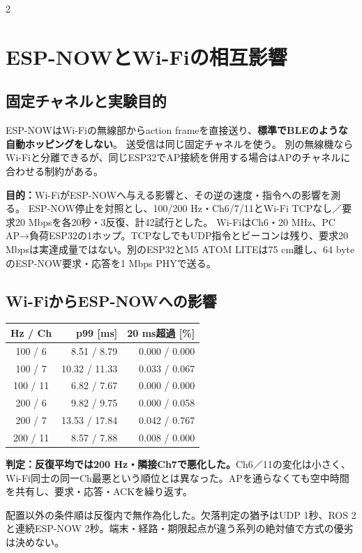 \documentclass[a4paper,twocolumn,10pt]{ltjsarticle}
\begin{document}
\begin{multicols}{2}\fontsize{10}{14}\selectfont\raggedcolumns

\section{ESP-NOWとWi-Fiの相互影響}
\subsection{固定チャネルと実験目的}
ESP-NOWはWi-Fiの無線部からaction frameを直接送り、\textbf{標準でBLEのような自動ホッピングをしない}。
送受信は同じ固定チャネルを使う\cite{espnow}。
別の無線機ならWi-Fiと分離できるが、同じESP32でAP接続を併用する場合はAPのチャネルに合わせる制約がある\cite{espnowFAQ}。

\textbf{目的：}Wi-FiがESP-NOWへ与える影響と、その逆の速度・指令への影響を測る。
ESP-NOW停止を対照とし、100/200 Hz・Ch6/7/11とWi-Fi TCPなし／要求20 Mbpsを各20秒・3反復、計42試行とした。
Wi-FiはCh6・20 MHz、PC AP→負荷ESP32の1ホップ。TCPなしでもUDP指令とビーコンは残り、要求20 Mbpsは実達成量ではない。別のESP32とM5 ATOM LITEは75 cm離し、64 byteのESP-NOW要求・応答を1 Mbps PHYで送る。

\subsection{Wi-FiからESP-NOWへの影響}
\begin{center}
\small\begin{tabular}{@{}crr@{}}\toprule Hz / Ch & p99 [ms] & 20 ms超過 [\%]\\\midrule
100 / 6 & 8.51 / 8.79 & 0.000 / 0.000\\
100 / 7 & 10.32 / 11.33 & 0.033 / 0.067\\
100 / 11 & 6.82 / 7.67 & 0.000 / 0.000\\
200 / 6 & 9.82 / 9.75 & 0.000 / 0.058\\
200 / 7 & 13.53 / 17.84 & 0.042 / 0.767\\
200 / 11 & 8.57 / 7.88 & 0.008 / 0.000\\
\bottomrule\end{tabular}\end{center}
\textbf{判定：反復平均では200 Hz・隣接Ch7で悪化した。}Ch6／11の変化は小さく、Wi-Fi同士の同一Ch最悪という順位とは異なった。APを通らなくても空中時間を共有し、要求・応答・ACKを繰り返す。

配置以外の条件順は反復内で無作為化した。欠落判定の猶予はUDP 1秒、ROS 2と連続ESP-NOW 2秒。端末・経路・期限起点が違う系列の絶対値で方式の優劣は決めない。


\end{multicols}
\end{document}
